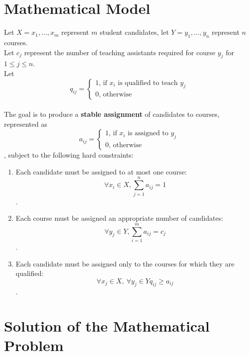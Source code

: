 \documentclass[twoside,twocolumn]{article}
\begin{document}
    \section{Mathematical Model}
    Let $X = {x_1,...,x_m}$ represent $m$ student candidates, let $Y = {y_1,...,y_n}$ represent $n$ courses. \\
    Let $c_j$ represent the number of teaching assistants required for course $y_j$ for $1 \leq j \leq n$. \\
    Let $$q_{ij} = \begin{cases}1\text{, if $x_i$ is qualified to teach $y_j$} \\ 0\text{, otherwise} \end{cases}$$ \\
    The goal is to produce a \textbf{stable assignment} of candidates to courses, represented as 
    $$a_{ij} = \begin{cases}1\text{, if $x_i$ is assigned to $y_j$} \\ 0\text{, otherwise} \end{cases}$$, 
    subject to the following hard constraints:
    \begin{enumerate}
        \item Each candidate must be assigned to at most one course: $$\forall x_i \in X, \sum_{j = 1}^n a_{ij} = 1$$.
        \item Each course must be assigned an appropriate number of candidates: $$\forall y_j \in Y, \sum_{i = 1}^m a_{ij} = c_j$$.
        \item Each candidate must be assigned only to the courses for which they are qualified: $$\forall x_j \in X,\ \forall y_j \in Y q_{ij} \geq a_{ij}$$.
    \end{enumerate}
    \section{Solution of the Mathematical Problem}
\end{document}
